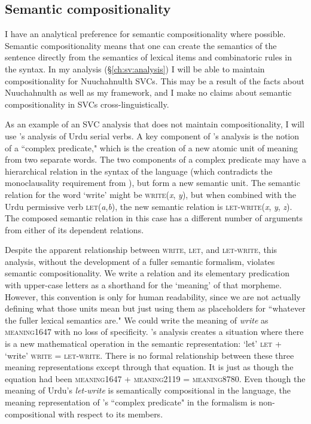 \subsection{Semantic compositionality} \label{ch:sv:def:compositionality}

I have an analytical preference for semantic compositionality where possible. Semantic compositionality means that one can create the semantics of the sentence directly from the semantics of lexical items and combinatoric rules in the syntax. In my analysis (\S\ref{ch:sv:analysis}) I will be able to maintain compositionality for Nuuchahnulth SVCs. This may be a result of the facts about Nuuchahnulth as well as my framework, and I make no claims about semantic compositionality in SVCs cross-linguistically.

As an example of an SVC analysis that does not maintain compositionality, I will use \citet{butt1995}'s analysis of Urdu serial verbs.  A key component of \citeauthor{butt1995}'s analysis is the notion of a ``complex predicate," which is the creation of a new atomic unit of meaning from two separate words. The two components of a complex predicate may have a hierarchical relation in the syntax of the language (which contradicts the monoclausality requirement from \citet{aikhenvalddixon2006}), but form a new semantic unit. The semantic relation for the word `write' might be \textsc{write}(\textit{x}, \textit{y}), but when combined with the Urdu permissive verb \textsc{let}(\textit{a},\textit{b}), the new semantic relation is \textsc{let-write}(\textit{x}, \textit{y}, \textit{z}). The composed semantic relation in this case has a different number of arguments from either of its dependent relations.

Despite the apparent relationship between \textsc{write}, \textsc{let}, and \textsc{let-write}, this analysis, without the development of a fuller semantic formalism, violates semantic compositionality. We write a relation and its elementary predication with upper-case letters as a shorthand for the `meaning' of that morpheme. However, this convention is only for human readability, since we are not actually defining what those units mean but just using them as placeholders for ``whatever the fuller lexical semantics are." We could write the meaning of \textit{write} as \textsc{meaning1647} with no loss of specificity. \citeauthor{butt1995}'s analysis creates a situation where there is a new mathematical operation in the semantic representation: `let' \textsc{let} + `write' \textsc{write} = \textsc{let-write}. There is no formal relationship between these three meaning representations except through that equation. It is just as though the equation had been \textsc{meaning1647} + \textsc{meaning2119} = \textsc{meaning8780}. Even though the meaning of Urdu's \textit{let-write} is semantically compositional in the language, the meaning representation of \citeauthor{butt1995}'s ``complex predicate" in the formalism is non-compositional with respect to its members.

